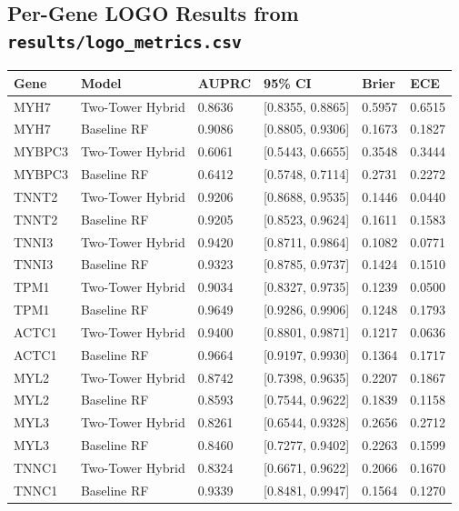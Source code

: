\documentclass[11pt,a4paper]{article}
\begin{document}
\subsection{Per-Gene LOGO Results from \texttt{results/logo\_metrics.csv}}
\begin{longtable}{p{} p{} p{} p{} p{} p{}}
\toprule
\textbf{Gene} & \textbf{Model} & \textbf{AUPRC} & \textbf{95\% CI} & \textbf{Brier} & \textbf{ECE} \\
\midrule
MYH7 & Two-Tower Hybrid & 0.8636 & [0.8355, 0.8865] & 0.5957 & 0.6515 \\
MYH7 & Baseline RF & 0.9086 & [0.8805, 0.9306] & 0.1673 & 0.1827 \\
MYBPC3 & Two-Tower Hybrid & 0.6061 & [0.5443, 0.6655] & 0.3548 & 0.3444 \\
MYBPC3 & Baseline RF & 0.6412 & [0.5748, 0.7114] & 0.2731 & 0.2272 \\
TNNT2 & Two-Tower Hybrid & 0.9206 & [0.8688, 0.9535] & 0.1446 & 0.0440 \\
TNNT2 & Baseline RF & 0.9205 & [0.8523, 0.9624] & 0.1611 & 0.1583 \\
TNNI3 & Two-Tower Hybrid & 0.9420 & [0.8711, 0.9864] & 0.1082 & 0.0771 \\
TNNI3 & Baseline RF & 0.9323 & [0.8785, 0.9737] & 0.1424 & 0.1510 \\
TPM1 & Two-Tower Hybrid & 0.9034 & [0.8327, 0.9735] & 0.1239 & 0.0500 \\
TPM1 & Baseline RF & 0.9649 & [0.9286, 0.9906] & 0.1248 & 0.1793 \\
ACTC1 & Two-Tower Hybrid & 0.9400 & [0.8801, 0.9871] & 0.1217 & 0.0636 \\
ACTC1 & Baseline RF & 0.9664 & [0.9197, 0.9930] & 0.1364 & 0.1717 \\
MYL2 & Two-Tower Hybrid & 0.8742 & [0.7398, 0.9635] & 0.2207 & 0.1867 \\
MYL2 & Baseline RF & 0.8593 & [0.7544, 0.9622] & 0.1839 & 0.1158 \\
MYL3 & Two-Tower Hybrid & 0.8261 & [0.6544, 0.9328] & 0.2656 & 0.2712 \\
MYL3 & Baseline RF & 0.8460 & [0.7277, 0.9402] & 0.2263 & 0.1599 \\
TNNC1 & Two-Tower Hybrid & 0.8324 & [0.6671, 0.9622] & 0.2066 & 0.1670 \\
TNNC1 & Baseline RF & 0.9339 & [0.8481, 0.9947] & 0.1564 & 0.1270 \\
\bottomrule
\end{longtable}
\end{document}
